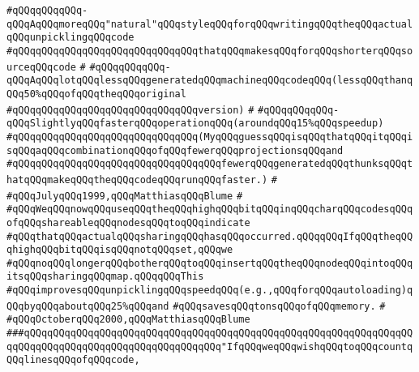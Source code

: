 \verb|#qQQqqQQqqQQq-qQQqAqQQqmoreqQQq"natural"qQQqstyleqQQqforqQQqwritingqQQqtheqQQqactualqQQqunpicklingqQQqcode|\newline
\verb|#qQQqqQQqqQQqqQQqqQQqqQQqqQQqqQQqthatqQQqmakesqQQqforqQQqshorterqQQqsourceqQQqcode|\newline
\verb|#|\newline
\verb|#qQQqqQQqqQQq-qQQqAqQQqlotqQQqlessqQQqgeneratedqQQqmachineqQQqcodeqQQq(lessqQQqthanqQQq50%qQQqofqQQqtheqQQqoriginal|\newline
\verb|#qQQqqQQqqQQqqQQqqQQqqQQqqQQqqQQqversion)|\newline
\verb|#|\newline
\verb|#qQQqqQQqqQQq-qQQqSlightlyqQQqfasterqQQqoperationqQQq(aroundqQQq15%qQQqspeedup)|\newline
\verb|#qQQqqQQqqQQqqQQqqQQqqQQqqQQqqQQq(MyqQQqguessqQQqisqQQqthatqQQqitqQQqisqQQqaqQQqcombinationqQQqofqQQqfewerqQQqprojectionsqQQqand|\newline
\verb|#qQQqqQQqqQQqqQQqqQQqqQQqqQQqqQQqqQQqfewerqQQqgeneratedqQQqthunksqQQqthatqQQqmakeqQQqtheqQQqcodeqQQqrunqQQqfaster.)|\newline
\verb|#|\newline
\verb|#qQQqJulyqQQq1999,qQQqMatthiasqQQqBlume|\newline
\verb|#|\newline
\verb|#qQQqWeqQQqnowqQQquseqQQqtheqQQqhighqQQqbitqQQqinqQQqcharqQQqcodesqQQqofqQQqshareableqQQqnodesqQQqtoqQQqindicate|\newline
\verb|#qQQqthatqQQqactualqQQqsharingqQQqhasqQQqoccurred.qQQqqQQqIfqQQqtheqQQqhighqQQqbitqQQqisqQQqnotqQQqset,qQQqwe|\newline
\verb|#qQQqnoqQQqlongerqQQqbotherqQQqtoqQQqinsertqQQqtheqQQqnodeqQQqintoqQQqitsqQQqsharingqQQqmap.qQQqqQQqThis|\newline
\verb|#qQQqimprovesqQQqunpicklingqQQqspeedqQQq(e.g.,qQQqforqQQqautoloading)qQQqbyqQQqaboutqQQq25%qQQqand|\newline
\verb|#qQQqsavesqQQqtonsqQQqofqQQqmemory.|\newline
\verb|#|\newline
\verb|#qQQqOctoberqQQq2000,qQQqMatthiasqQQqBlume|\newline
\newline
\newline
\newline
\verb|###qQQqqQQqqQQqqQQqqQQqqQQqqQQqqQQqqQQqqQQqqQQqqQQqqQQqqQQqqQQqqQQqqQQqqQQqqQQqqQQqqQQqqQQqqQQqqQQqqQQqqQQq"IfqQQqweqQQqwishqQQqtoqQQqcountqQQqlinesqQQqofqQQqcode,|\newline
